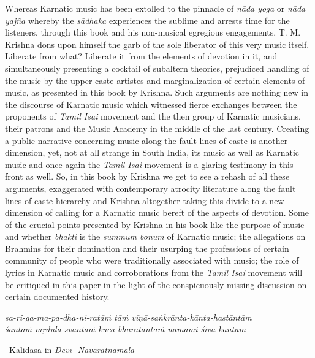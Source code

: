 Whereas Karnatic music has been extolled to the pinnacle of \textit{nāda yoga} or \textit{nāda yajña} whereby the \textit{sādhaka} experiences the sublime and arrests time for the listeners, through this book and his non-musical egregious engagements, T. M. Krishna dons upon himself the garb of the sole liberator of this very music itself. Liberate from what? Liberate it from the elements of devotion in it, and simultaneously presenting a cocktail of subaltern theories, prejudiced handling of the music by the upper caste artistes and marginalization of certain elements of music, as presented in this book by Krishna. Such arguments are nothing new in the discourse of Karnatic music which witnessed fierce exchanges between the proponents of \textit{Tamil Isai} movement and the then group of Karnatic musicians, their patrons and the Music Academy in the middle of the last century. Creating a public narrative concerning music along the fault lines of caste is another dimension, yet, not at all strange in South India, its music as well as Karnatic music and once again the \textit{Tamil Isai} movement is a glaring testimony in this front as well. So, in this book by Krishna we get to see a rehash of all these arguments, exaggerated with contemporary atrocity literature along the fault lines of caste hierarchy and Krishna altogether taking this divide to a new dimension of calling for a Karnatic music bereft of the aspects of devotion. Some of the crucial points presented by Krishna in his book like the purpose of music and whether \textit{bhakti} is the \textit{summum bonum} of Karnatic music; the allegations on Brahmins for their domination and their usurping the professions of certain community of people who were traditionally associated with music; the role of lyrics in Karnatic music and corroborations from the \textit{Tamil Isai} movement will be critiqued in this paper in the light of the conspicuously missing discussion on certain documented history.

\begin{myquote}
\textit{sa-ri-ga-ma-pa-dha-ni-ratāṁ tāṁ vīṇā-saṅkrānta-kānta-hastāntām }\\ \textit{śāntāṁ mṛdula-svāntāṁ kuca-bharatāntāṁ namāmi śiva-kāntām} 

~\hfill Kālidāsa in \textit{Devī- Navaratnamālā}
\end{myquote}


